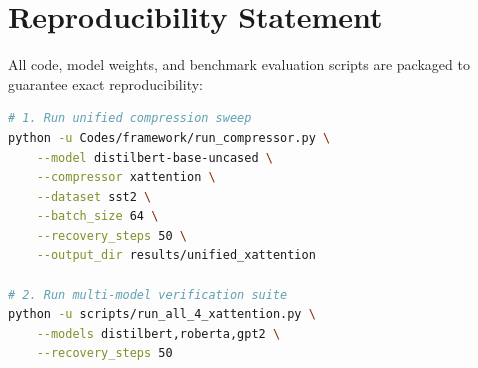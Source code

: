 \section{Reproducibility Statement}
All code, model weights, and benchmark evaluation scripts are packaged to guarantee exact reproducibility:
\begin{lstlisting}[language=bash]
# 1. Run unified compression sweep
python -u Codes/framework/run_compressor.py \
    --model distilbert-base-uncased \
    --compressor xattention \
    --dataset sst2 \
    --batch_size 64 \
    --recovery_steps 50 \
    --output_dir results/unified_xattention

# 2. Run multi-model verification suite
python -u scripts/run_all_4_xattention.py \
    --models distilbert,roberta,gpt2 \
    --recovery_steps 50
\end{lstlisting}
